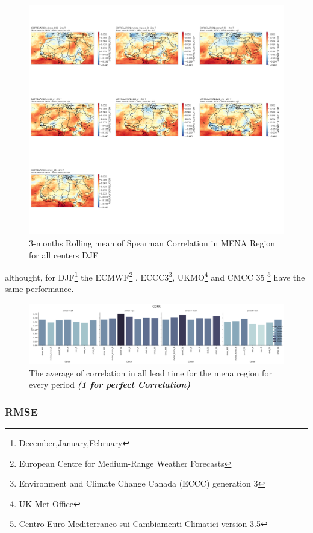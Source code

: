 \begin{figure}[H]
\includegraphics[scale=0.3]{CORR_DJF.png}
\caption{3-months Rolling mean of Spearman Correlation in MENA Region for all centers DJF}
\end{figure}

althought, for DJF\footnote{December,January,February} the ECMWF\footnote{European Centre for Medium-Range Weather Forecasts } , ECCC3\footnote{Environment and Climate Change Canada (ECCC) generation 3}, UKMO\footnote{UK Met Office} and CMCC 35 \footnote{Centro Euro-Mediterraneo sui Cambiamenti Climatici version 3.5} have the same performance.

\begin{figure}[H]
	\centering
	\includegraphics[scale=0.3]{corr.png}
	\caption{The average of correlation in all lead time for the mena region for every period \textbf{\textit{(1 for perfect Correlation)} }}

\end{figure}





\subsubsection{RMSE}
 
